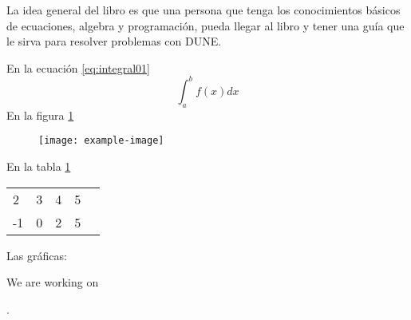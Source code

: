 La idea general del libro es que una persona que tenga los conocimientos básicos
de ecuaciones, algebra y programación, pueda llegar al libro y tener una 
guía que le sirva para resolver problemas con DUNE.

En la ecuación \eqref{eq:integral01}
\begin{equation}\label{eq:integral01}
 \int_a^bf(x)dx
\end{equation}
En la figura \ref{fig:prueba01}
\begin{figure}\label{fig:prueba01}
    \texttt{[image: example-image]}
\end{figure}
En la tabla \ref{tabla:matriz01}
\begin{table}[H]\label{tabla:matriz01}
    \begin{tabular}{lllll}
     2& 3 & 4 & 5 &  \\
     -1& 0 & 2 & 5 &  
    \end{tabular}
\end{table}
Las gráficas:

We are working on
.
